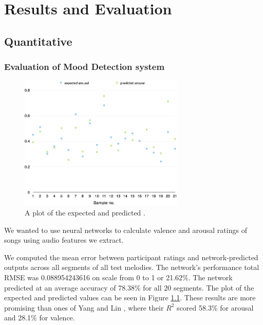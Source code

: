 
\chapter{Results and Evaluation} %

\label{Chapter6} %




\section{Quantitative}
\vspace{10pt}

\subsection{Evaluation of Mood Detection system}

\begin{figure}[t]
    \includegraphics[width=0.7\textwidth]{Figures/finalarousal}
    \centering

  \caption{A plot of the expected and predicted .}
  \label{fig:anneval}
\end{figure}


We wanted to use neural networks to calculate valence and arousal ratings of songs using audio features we extract. 

We computed the mean error between participant ratings and network-predicted outputs across all segments of all test melodies. The network's performance total RMSE was 0.088954243616 on scale from 0 to 1 or 21.62\%.
The network predicted at an average accuracy of 78.38\% for all 20 segments. The plot of the expected and predicted values can be seen in Figure \ref{fig:anneval}.
These results are more promising than ones of Yang and Lin \cite{mood}, where their $R^2$ scored 58.3\% for arousal and 28.1\% for valence.



